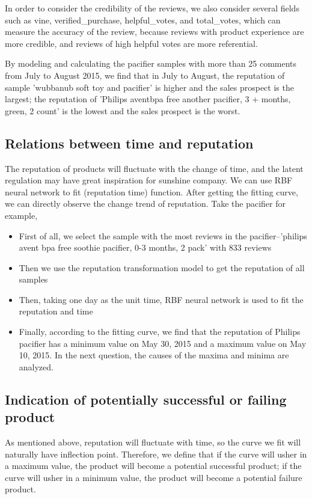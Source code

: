 \documentclass{mcmthesis}
\begin{document}
In order to consider the credibility of the reviews, we also consider several fields such as vine, verified\_purchase, helpful\_votes, and total\_votes, which can measure the accuracy of the review, because reviews with product experience are more credible, and reviews of high helpful votes are more referential.

By modeling and calculating the pacifier samples with more than 25 comments from July to August 2015, we find that in July to August, the reputation of sample 'wubbanub soft toy and pacifier' is higher and the sales prospect is the largest; the reputation of 'Philips aventbpa free another pacifier, 3 + months, green, 2 count' is the lowest and the sales prospect is the worst.

\subsection{Relations between time and reputation}
The reputation of products will fluctuate with the change of time, and the latent regulation may have great inspiration for sunshine company. We can use RBF neural network\cite{li2016nonlinear} to fit (reputation time) function. After getting the fitting curve, we can directly observe the change trend of reputation. Take the pacifier for example,

\begin{itemize}
	\item First of all, we select the sample with the most reviews in the pacifier--'philips avent bpa free soothie pacifier, 0-3 months, 2 pack' with 833 reviews
	\item Then we use the reputation transformation model to get the reputation of all samples
	\item Then, taking one day as the unit time, RBF neural network is used to fit the reputation and time
	\item Finally, according to the fitting curve, we find that the reputation of Philips pacifier has a minimum value on May 30, 2015 and a maximum value on May 10, 2015. In the next question, the causes of the maxima and minima are analyzed.
\end{itemize}

\subsection{Indication of potentially successful or failing product}
As mentioned above, reputation will fluctuate with time, so the curve we fit will naturally have inflection point. Therefore, we define that if the curve will usher in a maximum value, the product will become a potential successful product; if the curve will usher in a minimum value, the product will become a potential failure product.
\end{document}

